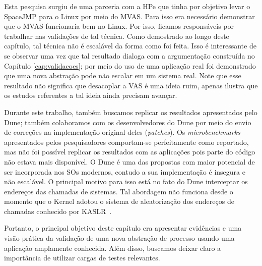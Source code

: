 Esta pesquisa surgiu de uma parceria com a HPe que tinha por objetivo levar o
SpaceJMP para o Linux por meio do MVAS. Para isso era necessário
demonstrar que o MVAS funcionaria bem no Linux. Por isso, ficamos responsáveis
por trabalhar nas validações de tal técnica. Como demostrado ao longo deste
capítulo, tal técnica não é escalável da forma como foi feita. Isso é
interessante de se observar uma vez que tal resultado dialoga com a
argumentação construída no Capítulo \ref{cap:validacoes}; por meio do uso de uma
aplicação real foi demonstrado que uma nova abstração pode não escalar em um sistema real.
Note que esse resultado não significa que desacoplar a VAS é uma ideia ruim,
apenas ilustra que os estudos referentes a tal ideia ainda precisam avançar.

Durante este trabalho, também buscamos replicar os resultados apresentados pelo
Dune; também colaboramos com os desenvolvedores do Dune por meio do envio de
correções na implementação original deles (\textit{patches}). Os \textit{microbenchmarks} apresentados pelos pesquisadores
comportam-se perfeitamente como reportado, mas não foi possível replicar os
resultados com as aplicações pois parte do código não estava mais disponível. O
Dune é uma das propostas com maior potencial de ser incorporada nos SOs
modernos, contudo a sua implementação é insegura e não escalável. O principal
motivo para isso está no fato do Dune interceptar os endereços das chamadas de
sistemas. Tal abordagem não funciona desde o momento que o Kernel adotou o
sistema de aleatorização dos endereços de chamadas conhecido por
KASLR~\citep{kaslr}.

Portanto, o principal objetivo deste capítulo era apresentar evidências e uma
visão prática da validação de uma nova abstração de processo usando uma
aplicação amplamente conhecida. Além disso, buscamos deixar claro a importância
de utilizar cargas de testes relevantes.
